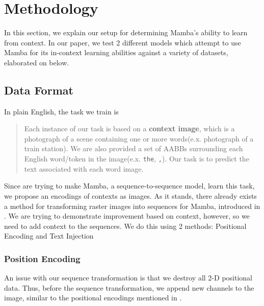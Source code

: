 \section{Methodology}
In this section, we explain our setup for determining Mamba's ability to learn
from context.
In our paper, we test 2 different models which attempt to use Mamba for its
in-context learning abilities against a variety of datasets, elaborated on
below.
\subsection{Data Format}
In plain English, the task we train is
\begin{quote}
    Each instance of our task is based on a \textbf{context image}, which
    is a photograph of a scene containing one or more words(e.x. photograph of a
    train station).
    We are also provided a set of AABBs surrounding each English word/token in
    the image(e.x. \verb|the|, \verb|,|).
    Our task is to predict the text associated with each word image.
\end{quote}
Since are trying to make Mamba, a sequence-to-sequence model, learn this task,
we propose an encodings of contexts as images.
As it stands, there already exists a method for transforming raster images into
sequences for Mamba, introduced in \cite{vmamba}.
We are trying to demonstrate improvement based on context, however, so we need
to add context to the sequences. We do this using 2 methods: Positional Encoding
and Text Injection

\subsubsection{Position Encoding}
An issue with our sequence transformation is that we destroy all 2-D positional
data.
Thus, before the sequence transformation, we append new channels to the image,
similar to the positional encodings mentioned in \cite{attention}.

